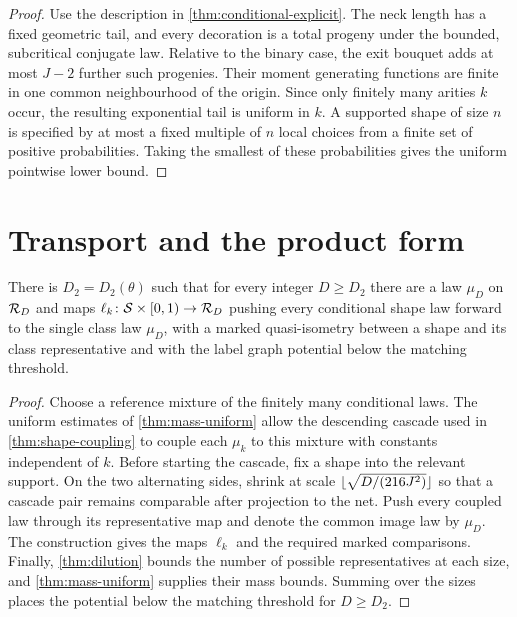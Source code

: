 \begin{proof}
Use the description in \cref{thm:conditional-explicit}. The neck length has a fixed geometric
tail, and every decoration is a total progeny under the bounded, subcritical conjugate law. Relative
to the binary case, the exit bouquet adds at most $J-2$ further such progenies. Their moment
generating functions are finite in one common neighbourhood of the origin. Since only finitely
many arities $k$ occur, the resulting exponential tail is uniform in $k$. A supported shape of
size $n$ is specified by at most a fixed multiple of $n$ local choices from a finite set of
positive probabilities. Taking the smallest of these probabilities gives the uniform pointwise
lower bound.
\end{proof}

\section{Transport and the product form}

\begin{lemma}
\label{thm:relabel}
\leanok
{}
There is $D_2=D_2(\theta)$ such that for every integer $D\geq D_2$ there are a law $\mu_D$ on
$\mathcal{R}_D$ and maps $\ell_k\colon\mathcal{S}\times[0,1)\to\mathcal{R}_D$ pushing every conditional shape law
forward to the single class law $\mu_D$, with a marked quasi-isometry between a shape and its
class representative and with the label graph potential below the matching threshold.
\end{lemma}

\begin{proof}
\leanok
{}
Choose a reference mixture of the finitely many conditional laws. The uniform estimates of
\cref{thm:mass-uniform} allow the descending cascade used in
\cref{thm:shape-coupling} to couple each $\mu_k$ to this mixture with constants independent of
$k$. Before starting the cascade, fix a shape into the relevant support. On the two alternating
sides, shrink at scale $\lfloor \sqrt{D/(216J^2)} \rfloor$ so that a cascade pair remains comparable
after projection to the net. Push every coupled law through its representative map and denote the
common image law by $\mu_D$. The construction gives the maps $\ell_k$ and the required marked
comparisons. Finally, \cref{thm:dilution} bounds the number of possible representatives at each
size, and \cref{thm:mass-uniform} supplies their mass bounds. Summing over the sizes places the
potential below the matching threshold for $D\geq D_2$.
\end{proof}

